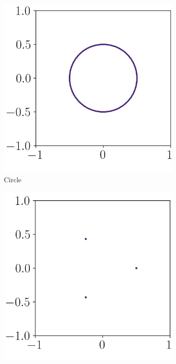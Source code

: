 \begin{figure}
  \begin{subfigure}[h]{0.25\linewidth}
    \centering
    \includegraphics[width=0.9\linewidth]{figures/TestCases/Circlepoints.png}
    \caption{Circle}
    \label{fig:test-case-circle} 
    \vspace{1em}
  \end{subfigure}%
  \begin{subfigure}[h]{0.25\linewidth}
    \centering
    \includegraphics[width=0.9\linewidth]{figures/TestCases/Fewpoints.png} 

\end{subfigure}
\end{figure}
